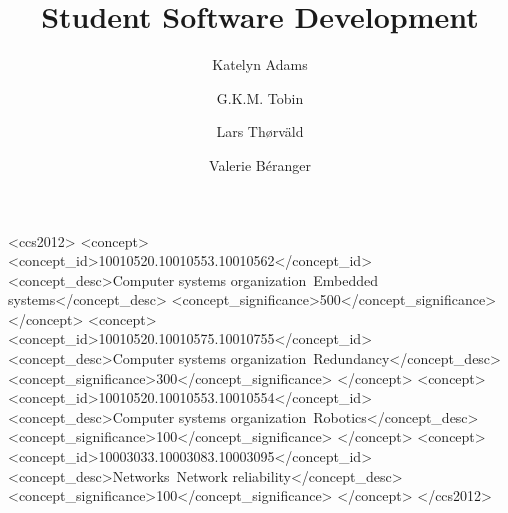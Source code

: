 

\title{Student Software Development}

\author{Katelyn Adams}
\author{G.K.M. Tobin}
\authornotemark[1]

\author{Lars Th{\o}rv{\"a}ld}

\author{Valerie B\'eranger}

\renewcommand{\shortauthors}{Trovato and Tobin, et al.}

\begin{abstract}
 
\end{abstract}

\begin{CCSXML}
<ccs2012>
 <concept>
  <concept_id>10010520.10010553.10010562</concept_id>
  <concept_desc>Computer systems organization~Embedded systems</concept_desc>
  <concept_significance>500</concept_significance>
 </concept>
 <concept>
  <concept_id>10010520.10010575.10010755</concept_id>
  <concept_desc>Computer systems organization~Redundancy</concept_desc>
  <concept_significance>300</concept_significance>
 </concept>
 <concept>
  <concept_id>10010520.10010553.10010554</concept_id>
  <concept_desc>Computer systems organization~Robotics</concept_desc>
  <concept_significance>100</concept_significance>
 </concept>
 <concept>
  <concept_id>10003033.10003083.10003095</concept_id>
  <concept_desc>Networks~Network reliability</concept_desc>
  <concept_significance>100</concept_significance>
 </concept>
</ccs2012>
\end{CCSXML}


